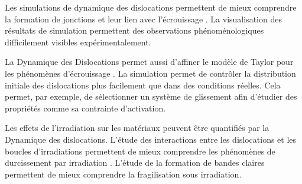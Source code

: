 \documentclass[11pt,class=article,float=false,crop=false]{standalone}
\begin{document}
Les simulations de dynamique des dislocations permettent de mieux comprendre la formation de jonctions et leur lien avec l'écrouissage . La visualisation des résultats de simulation permettent des observations phénoménologiques difficilement visibles expérimentalement.

La Dynamique des Dislocations permet aussi d'affiner le modèle de Taylor pour les phénomènes d'écrouissage . La simulation permet de contrôler la distribution initiale des dislocations plus facilement que dans des conditions réelles. Cela permet, par exemple, de sélectionner un système de glissement afin d'étudier des propriétés comme sa contrainte d'activation.


Les effets de l'irradiation sur les matériaux peuvent être quantifiés par la Dynamique des dislocations. L'étude des interactions entre les dislocations et les boucles d'irradiations permettent de mieux comprendre les phénomènes de durcissement par irradiation . L'étude de la formation de bandes claires  permettent de mieux comprendre la fragilisation sous irradiation.
\end{document}
